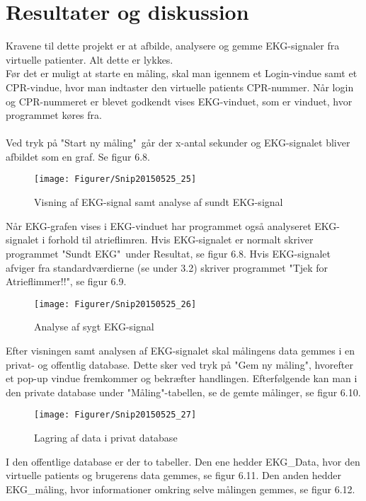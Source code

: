 \section{Resultater og diskussion}
Kravene til dette projekt er at afbilde, analysere og gemme EKG-signaler fra virtuelle patienter. Alt dette er lykkes. \\ 
Før det er muligt at starte en måling, skal man igennem et Login-vindue samt et CPR-vindue, hvor man indtaster den virtuelle patients CPR-nummer. Når login og CPR-nummeret er blevet godkendt vises EKG-vinduet, som er vinduet, hvor programmet køres fra. \\ \\
Ved tryk på "Start ny måling"\  går der x-antal sekunder og EKG-signalet bliver afbildet som en graf. Se figur 6.8. 

\begin{figure}[H]
	\centering
	\texttt{[image: Figurer/Snip20150525\_25]}
	\caption{Visning af EKG-signal samt analyse af sundt EKG-signal}
\end{figure}

Når EKG-grafen vises i EKG-vinduet har programmet også analyseret EKG-signalet i forhold til atrieflimren. Hvis EKG-signalet er normalt skriver programmet "Sundt EKG"\  under Resultat, se figur 6.8. Hvis EKG-signalet afviger fra standardværdierne (se under 3.2) skriver programmet "Tjek for Atrieflimmer!!", se figur 6.9. 

\begin{figure}[H]
	\centering
	\texttt{[image: Figurer/Snip20150525\_26]}
	\caption{Analyse af sygt EKG-signal}
\end{figure}

Efter visningen samt analysen af EKG-signalet skal målingens data gemmes i en privat- og offentlig database. Dette sker ved tryk på "Gem ny måling", hvorefter et pop-up vindue fremkommer og bekræfter handlingen. Efterfølgende kan man i den private database under "Måling"\--tabellen, se de gemte målinger, se figur 6.10.   

\begin{figure}[H]
	\centering
	\texttt{[image: Figurer/Snip20150525\_27]}	
	\caption{Lagring af data i privat database}
\end{figure}

I den offentlige database er der to tabeller. Den ene hedder EKG\_Data, hvor den virtuelle patients og brugerens data gemmes, se figur 6.11. Den anden hedder EKG\_måling, hvor informationer omkring selve målingen gemmes, se figur 6.12. 

